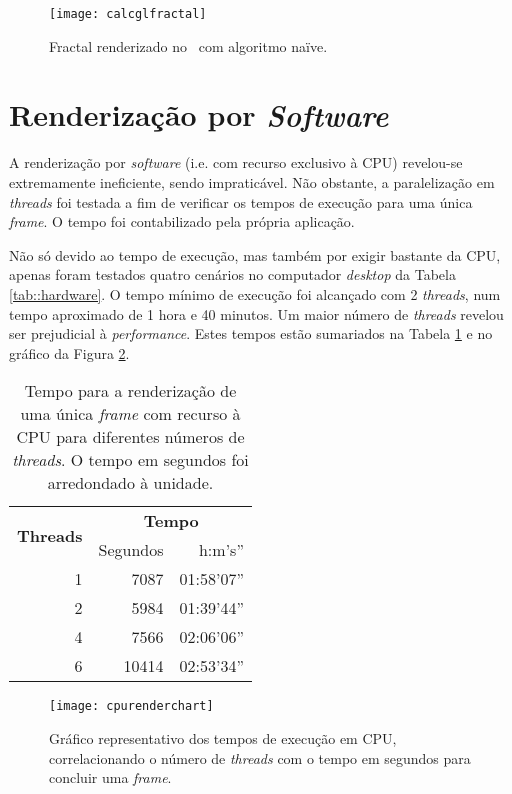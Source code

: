 \begin{figure}[!htbp]
	\centering
	\texttt{[image: calcglfractal]}
	\caption[Fractal no \theapp~com algoritmo naïve]{Fractal renderizado no \theapp~com algoritmo naïve.}
	\label{fig::calcglfractal}
\end{figure}



\section{Renderização por \textit{Software}}
\label{sec::testes:software}

A renderização por \textit{software} (i.e. com recurso exclusivo à \ac{CPU}) revelou-se extremamente ineficiente, sendo impraticável. Não obstante, a paralelização em \textit{threads} foi testada a fim de verificar os tempos de execução para uma única \textit{frame}. O tempo foi contabilizado pela própria aplicação.

Não só devido ao tempo de execução, mas também por exigir bastante da \ac{CPU}, apenas foram testados quatro cenários no computador \textit{desktop} da Tabela \ref{tab::hardware}. O tempo mínimo de execução foi alcançado com 2 \textit{threads}, num tempo aproximado de 1 hora e 40 minutos. Um maior número de \textit{threads} revelou ser prejudicial à \textit{performance}. Estes tempos estão sumariados na Tabela \ref{tab::render_cpu} e no gráfico da Figura \ref{fig::cpurenderchart}.

\begin{table}[!htbp]
	\centering
	\caption[Tempos de renderização em \acs{CPU}]{Tempo para a renderização de uma única \textit{frame} com recurso à \acs{CPU} para diferentes números de \textit{threads}. O tempo em segundos foi arredondado à unidade.}
	\label{tab::render_cpu}
	\begin{tabular}{r r r}
		\toprule
		\multirow{2}{*}{\textbf{Threads}} & \multicolumn{2}{c}{\textbf{Tempo}} \\
		\cline{2-3}
		& Segundos & h:m's'' \\
		\midrule
		1 &  7087 & 01:58'07'' \\
		2 &  5984 & 01:39'44'' \\
		4 &  7566 & 02:06'06'' \\
		6 & 10414 & 02:53'34'' \\
		\bottomrule
	\end{tabular}
\end{table}

\begin{figure}[!htbp]
	\centering
	\texttt{[image: cpurenderchart]}
	\caption[Gráfico dos tempos de execução em \acs{CPU}]{Gráfico representativo dos tempos de execução em \acs{CPU}, correlacionando o número de \textit{threads} com o tempo em segundos para concluir uma \textit{frame}.}
	\label{fig::cpurenderchart}
\end{figure}
